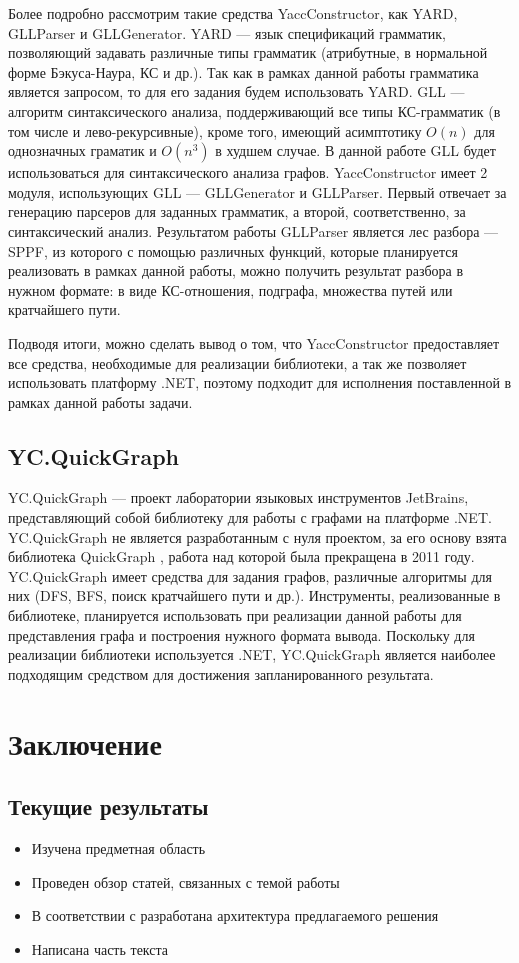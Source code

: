 \documentclass[14pt]{matmex-diploma-custom}
\begin{document}
	    Более подробно рассмотрим такие средства YaccConstructor, как YARD, GLLParser и GLLGenerator. YARD --- язык спецификаций грамматик, позволяющий задавать различные типы грамматик (атрибутные, в нормальной форме Бэкуса-Наура, КС и др.). Так как в рамках данной работы грамматика является запросом, то для его задания будем использовать YARD. GLL --- алгоритм синтаксического анализа, поддерживающий все типы КС-грамматик (в том числе и лево-рекурсивные), кроме того, имеющий асимптотику \(O(n)\) для однозначных граматик и \(O(n^3)\) в худшем случае. В данной работе GLL будет использоваться для синтаксического анализа графов. YaccConstructor имеет 2 модуля, использующих GLL --- GLLGenerator и GLLParser. Первый отвечает за генерацию парсеров для заданных грамматик, а второй, соответственно, за синтаксический анализ. Результатом работы GLLParser является лес разбора --- SPPF, из которого с помощью различных функций, которые планируется реализовать в рамках данной работы, можно получить результат разбора в нужном формате: в виде КС-отношения, подграфа, множества путей или кратчайшего пути.
	    
	    Подводя итоги, можно сделать вывод о том, что YaccConstructor предоставляет все средства, необходимые для реализации библиотеки, а так же позволяет использовать платформу .NET, поэтому подходит для исполнения поставленной в рамках данной работы задачи.
	\subsection{YC.QuickGraph}
	    YC.QuickGraph --- проект лаборатории языковых инструментов JetBrains, представляющий собой библиотеку для работы с графами на платформе .NET. YC.QuickGraph не является разработанным с нуля проектом, за его основу взята библиотека QuickGraph \cite{quickgraph}, работа над которой была прекращена в 2011 году. YC.QuickGraph имеет средства для задания графов, различные алгоритмы для них (DFS, BFS, поиск кратчайшего пути и др.). Инструменты, реализованные в библиотеке, планируется использовать при реализации данной работы для представления графа и построения нужного формата вывода. Поскольку для реализации библиотеки используется .NET, YC.QuickGraph является наиболее подходящим средством для достижения запланированного результата. 
\section{Заключение}
\subsection*{Текущие результаты}
\begin{itemize}
    \item Изучена предметная область
    \item Проведен обзор статей, связанных с темой работы
    \item В соответствии с \cite{funcdes1} \cite{funcdes2} разработана архитектура предлагаемого решения
    \item Написана часть текста
\end{itemize}
\end{document}
